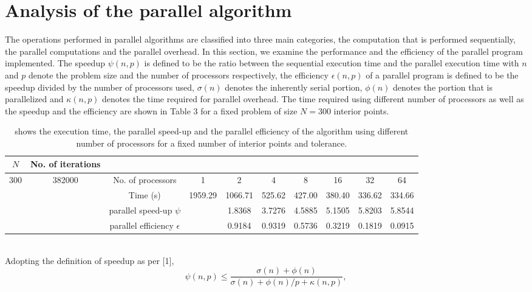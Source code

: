 \section{Analysis of the parallel algorithm}
The operations performed in parallel algorithms are classified into three main categories, the computation that is performed sequentially, the parallel computations and the parallel overhead. In this section, we examine the performance and the efficiency of the parallel program implemented. The speedup $\psi(n,p)$ is defined to be the ratio between the sequential execution time and the parallel execution time with $n$ and $p$ denote the problem size and the number of processors respectively, the efficiency $\epsilon(n,p)$ of a parallel program is defined to be the speedup divided by the number of processors used, $\sigma(n)$ denotes the inherently serial portion, $\phi(n)$ denotes the portion that is parallelized and $\kappa(n,p)$ denotes the time required for parallel overhead. The time required using different number of processors as well as the speedup and the efficiency are shown in Table 3 for a fixed problem of size $N = 300$ interior points.\\
\begin{table*}[h]
\centering
\footnotesize
\begin{tabular}{|c|c|c|c|c|c|c|c|c|c|}
\cline{1-2}
$N$ & No. of iterations\\
\hline
\multirow{4}{*}{300} &  \multirow{4}{*}{382000}
& No. of processors & 1        &2        &4      &8      &16     &32     &64\\
\cline{3-10}
&& Time (s)         & 1959.29  & 1066.71 &525.62 &427.00 &380.40 &336.62 &334.66 \\
\cline{3-10}
&&parallel speed-up $\psi$      &&1.8368  &3.7276   &4.5885   &5.1505  &5.8203  &5.8544\\
\cline{3-10}                   
&&parallel efficiency $\epsilon$&&0.9184  &0.9319   &0.5736   &0.3219  &0.1819  &0.0915\\
\hline
\end{tabular}
\caption{shows the execution time, the parallel speed-up and the parallel efficiency of the algorithm using different number of processors for a fixed number of interior points and tolerance.}
\end{table*}
~\\
Adopting the definition of speedup as per [1],
\begin{equation*}
\psi(n,p) \leq \frac{\sigma(n) + \phi(n)}{\sigma(n) + \phi(n)/p + \kappa(n,p)},
\end{equation*}
